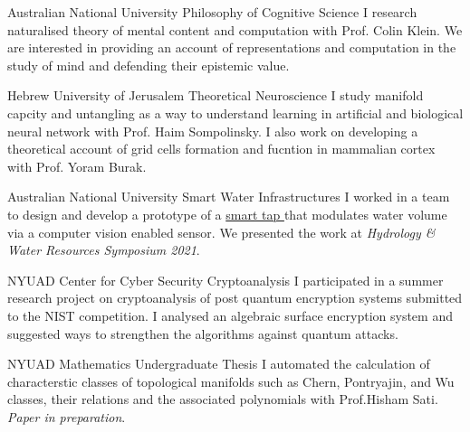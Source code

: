 {Australian National University}
{Philosophy of Cognitive Science}
{
	I research naturalised theory of mental content and computation with Prof. Colin Klein. We are interested in providing an account of representations and computation in the study of mind and defending their epistemic value.
}

{Hebrew University of Jerusalem}
{Theoretical Neuroscience}
{
	I study manifold capcity and untangling as a way to understand learning in artificial and biological neural network with Prof. Haim Sompolinsky. I also work on developing a theoretical account of grid cells formation and fucntion in mammalian cortex with Prof. Yoram Burak.  
}

{Australian National University}
{Smart Water Infrastructures}
{
	I worked in a team to design and develop a prototype of a 
	\href{http://tappyvision.herokuapp.com}{
		smart tap
	}that modulates water volume via a computer vision enabled sensor. We presented the work at \textit{Hydrology \& Water Resources Symposium 2021}.
}

{NYUAD Center for Cyber Security}
{Cryptoanalysis}
{
	I participated in a summer research project on cryptoanalysis of post quantum encryption systems submitted to the NIST competition. I analysed an algebraic surface encryption system and suggested ways to strengthen the algorithms against quantum attacks.
}

{NYUAD Mathematics}
{Undergraduate Thesis}
{
	I automated the calculation of characterstic classes of topological manifolds such as Chern, Pontryajin, and Wu classes, their relations and the associated polynomials with Prof.Hisham Sati. \textit{Paper in preparation}.
}